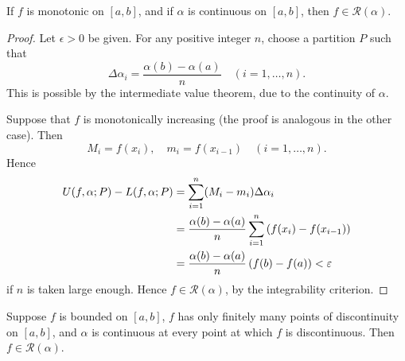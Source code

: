 \begin{proposition}
If $f$ is monotonic on $[a,b]$, and if $\alpha$ is continuous on $[a,b]$, then $f\in\mathcal{R}(\alpha)$.
\end{proposition}

\begin{proof}
Let $\epsilon>0$ be given. For any positive integer $n$, choose a partition $P$ such that
\[\Delta\alpha_i=\frac{\alpha(b)-\alpha(a)}{n}\quad(i=1,\dots,n).\]
This is possible by the intermediate value theorem, due to the continuity of $\alpha$.

Suppose that $f$ is monotonically increasing (the proof is analogous in the other case). Then
\[M_i=f(x_i),\quad m_i=f(x_{i-1})\quad(i=1,\dots,n).\]
Hence
\begin{align*}
U(f,\alpha;P)-L(f,\alpha;P)
&=\sum_{i=1}^{n}(M_i-m_i)\Delta\alpha_i\\
&=\frac{\alpha(b)-\alpha(a)}{n}\sum_{i=1}^{n}\left(f(x_i)-f(x_{i-1})\right)\\
&=\frac{\alpha(b)-\alpha(a)}{n}\left(f(b)-f(a)\right)<\varepsilon
\end{align*}
if $n$ is taken large enough. Hence $f\in\mathcal{R}(\alpha)$, by the integrability criterion.
\end{proof}

\begin{proposition}
Suppose $f$ is bounded on $[a,b]$, $f$ has only finitely many points of discontinuity on $[a,b]$, and $\alpha$ is continuous at every point at which $f$ is discontinuous. Then $f\in \mathcal{R}(\alpha)$.
\end{proposition}

